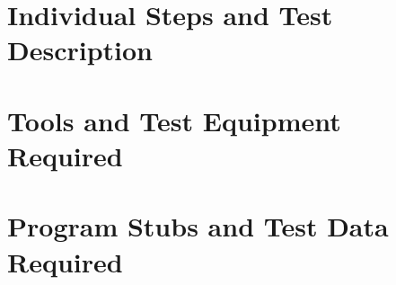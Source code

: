 \documentclass[18pt,oneside,a4paper, titlepage]{article}
\begin{document}
\newpage
\section{Individual	Steps	and	Test	Description}

\newpage
\section{Tools	and	Test	Equipment	Required}

\newpage
\section{Program	Stubs	and	Test	Data	Required}
\end{document}
